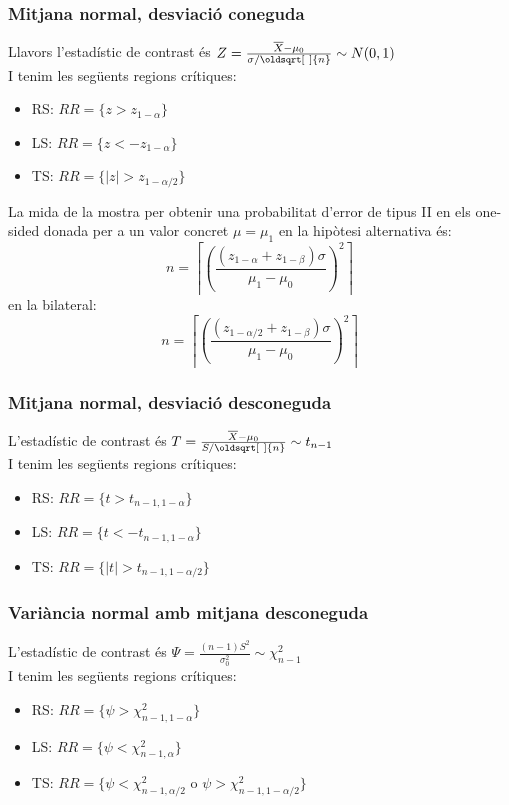 \documentclass[a4paper]{sciposter}
\renewcommand*{\sqrt}[2][\ ]{\oldsqrt[#1]{#2} }
\begin{document}
\begin{multicols}{3}
\subsubsection{Mitjana normal, desviació coneguda}
Llavors l'estadístic de contrast és $Z = \frac{\overline{X} - \mu_0}{\sigma/\sqrt{n}} \sim N(0,1)$\\
I tenim les següents regions crítiques:
\begin{itemize}
	\item RS: $RR = \{z > z_{1-\alpha}\}$
	\item LS: $RR = \{z < -z_{1-\alpha}\}$
	\item TS: $RR = \{|z| > z_{1-\alpha/2}\}$
\end{itemize}
La mida de la mostra per obtenir una probabilitat d'error de tipus II en els one-sided donada per a un valor concret $\mu = \mu_1$ en la hipòtesi alternativa és:
\begin{displaymath}
	n = \left\lceil\left(\frac{(z_{1-\alpha} + z_{1-\beta})\sigma}{\mu_1 - \mu_0}\right)^2\right\rceil
\end{displaymath}
en la bilateral:
\begin{displaymath}
	n = \left\lceil\left(\frac{(z_{1-\alpha/2} + z_{1-\beta})\sigma}{\mu_1 - \mu_0}\right)^2\right\rceil
\end{displaymath}
\subsubsection{Mitjana normal, desviació desconeguda}
L'estadístic de contrast és $T = \frac{\overline{X} - \mu_0}{S/\sqrt{n}} \sim t_{n-1}$\\
I tenim les següents regions crítiques:
\begin{itemize}
	\item RS: $RR = \{t > t_{n-1,1-\alpha}\}$
	\item LS: $RR = \{t < -t_{n-1,1-\alpha}\}$
	\item TS: $RR = \{|t| > t_{n-1,1-\alpha/2}\}$
\end{itemize}
\subsubsection{Variància normal amb mitjana desconeguda}
L'estadístic de contrast és $\Psi = \frac{(n-1)S^2}{\sigma_0^2} \sim \chi^2_{n-1}$\\
I tenim les següents regions crítiques:
\begin{itemize}
	\item RS: $RR = \{\psi > \chi^2_{n-1,1-\alpha}\}$
	\item LS: $RR = \{\psi < \chi^2_{n-1,\alpha}\}$
	\item TS: $RR = \{\psi < \chi^2_{n-1,\alpha/2} \text{ o } \psi > \chi^2_{n-1,1-\alpha/2}\}$
\end{itemize}

\end{multicols}
\end{document}
